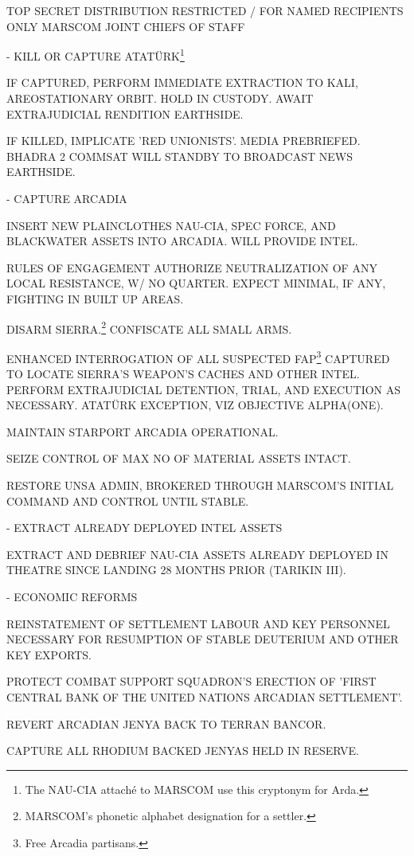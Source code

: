 \startTimelineCorrespondenceDocument
TOP SECRET
DISTRIBUTION RESTRICTED / FOR NAMED RECIPIENTS ONLY
MARSCOM JOINT CHIEFS OF STAFF
\startitemize[4]
\item {} - KILL OR CAPTURE ATATÜRK\footnote{The NAU-CIA attaché to MARSCOM use this cryptonym for Arda.}

    \startitemize[n]
    \item IF CAPTURED, PERFORM IMMEDIATE EXTRACTION TO KALI, AREOSTATIONARY ORBIT. HOLD IN CUSTODY. AWAIT EXTRAJUDICIAL RENDITION EARTHSIDE.
    \item IF KILLED, IMPLICATE 'RED UNIONISTS'. MEDIA PREBRIEFED. BHADRA 2 COMMSAT WILL STANDBY TO BROADCAST NEWS EARTHSIDE.
    \stopitemize

\item {} - CAPTURE ARCADIA
    \startitemize[n]
    \item INSERT NEW PLAINCLOTHES NAU-CIA, SPEC FORCE, AND BLACKWATER ASSETS INTO ARCADIA. WILL PROVIDE INTEL.
    \item RULES OF ENGAGEMENT AUTHORIZE NEUTRALIZATION OF ANY LOCAL RESISTANCE, W/ NO QUARTER. EXPECT MINIMAL, IF ANY, FIGHTING IN BUILT UP AREAS.
    \item DISARM SIERRA.\footnote{MARSCOM's phonetic alphabet designation for a settler.} CONFISCATE ALL SMALL ARMS.
    \item ENHANCED INTERROGATION OF ALL SUSPECTED FAP\footnote{Free Arcadia partisans.} CAPTURED TO LOCATE SIERRA'S WEAPON'S CACHES AND OTHER INTEL. PERFORM EXTRAJUDICIAL DETENTION, TRIAL, AND EXECUTION AS NECESSARY. ATATÜRK EXCEPTION, VIZ OBJECTIVE ALPHA(ONE).
    \item MAINTAIN STARPORT ARCADIA OPERATIONAL.
    \item SEIZE CONTROL OF MAX NO OF MATERIAL ASSETS INTACT.
    \item RESTORE UNSA ADMIN, BROKERED THROUGH MARSCOM'S INITIAL COMMAND AND CONTROL UNTIL STABLE.
    \stopitemize

\item {} - EXTRACT ALREADY DEPLOYED INTEL ASSETS
    \startitemize[n]
    \item EXTRACT AND DEBRIEF NAU-CIA ASSETS ALREADY DEPLOYED IN THEATRE SINCE LANDING 28 MONTHS PRIOR (TARIKIN III).
    \stopitemize

\item {} - ECONOMIC REFORMS
    \startitemize[n]
    \item REINSTATEMENT OF SETTLEMENT LABOUR AND KEY PERSONNEL NECESSARY FOR RESUMPTION OF STABLE DEUTERIUM AND OTHER KEY EXPORTS.
    \item PROTECT COMBAT SUPPORT SQUADRON'S ERECTION OF 'FIRST CENTRAL BANK OF THE UNITED NATIONS ARCADIAN SETTLEMENT'.
    \item REVERT ARCADIAN JENYA BACK TO TERRAN BANCOR.
    \item CAPTURE ALL RHODIUM BACKED JENYAS HELD IN RESERVE.
    \stopitemize

